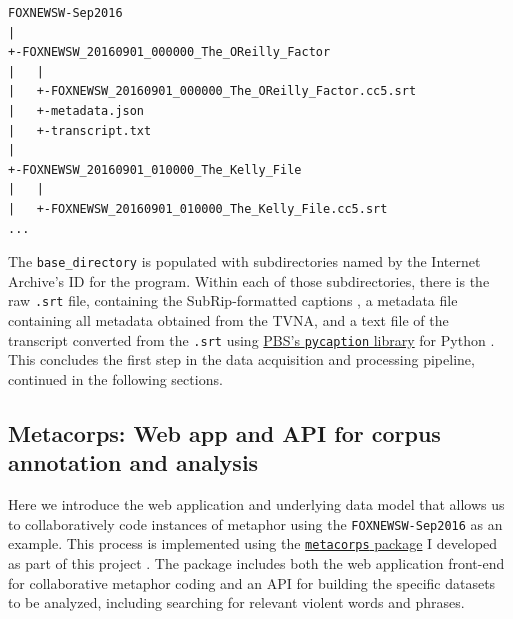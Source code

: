 {\small
\begin{verbatim} 
FOXNEWSW-Sep2016
|
+-FOXNEWSW_20160901_000000_The_OReilly_Factor
|   |
|   +-FOXNEWSW_20160901_000000_The_OReilly_Factor.cc5.srt
|   +-metadata.json
|   +-transcript.txt
|
+-FOXNEWSW_20160901_010000_The_Kelly_File
|   |
|   +-FOXNEWSW_20160901_010000_The_Kelly_File.cc5.srt
...
\end{verbatim}
}

\noindent
The \texttt{base\_directory} is populated with subdirectories named by the Internet
Archive's ID for the program. Within each of those subdirectories, there is
the raw \texttt{.srt} file, containing the SubRip-formatted captions 
\cite{Matroska2016}, a metadata file containing all metadata obtained from the
TVNA, and a text file of the transcript converted from the \texttt{.srt} using
\href{https://github.com/pbs/pycaption}{PBS's \texttt{pycaption} library} for Python
\cite{PBS2016}. This concludes the first step in the data acquisition and
processing pipeline, continued in the following sections.


\subsection{Metacorps: Web app and API for corpus annotation and analysis}
\label{sub:corpus-annotation}

Here we introduce the web application and underlying data model that allows us
to collaboratively code instances of metaphor using the \texttt{FOXNEWSW-Sep2016} as
an example. This process is implemented using the 
\href{http://github.com/mtpain/metacorps}{\texttt{metacorps} package} I developed
as part of this project \cite{Turner2017}. 
The package includes both the web application
front-end for collaborative metaphor coding and an API for building the 
specific datasets to be analyzed, including searching for relevant violent
words and phrases. 

